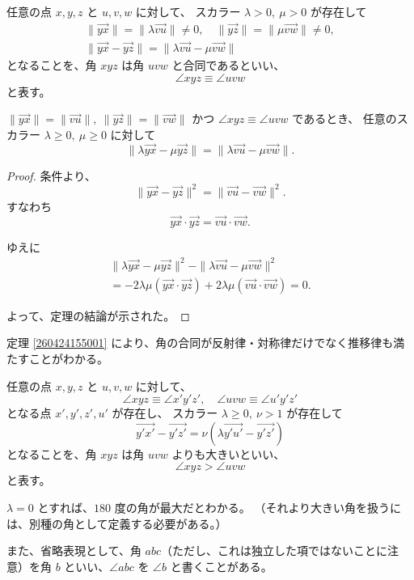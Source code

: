 \begin{dfn}
  任意の点 \(x,y,z\) と \(u,v,w\) に対して、
  スカラー \(\lambda>0,\ \mu>0\) が存在して
  \begin{gather*}
    \|\overrightarrow{yx}\|=\|\lambda\overrightarrow{vu}\|\neq 0,\quad\|\overrightarrow{yz}\|=\|\mu\overrightarrow{vw}\|\neq 0, \\
    \|\overrightarrow{yx}-\overrightarrow{yz}\|=\|\lambda\overrightarrow{vu}-\mu\overrightarrow{vw}\|
  \end{gather*}
  となることを、角 \(xyz\) は角 \(uvw\) と合同であるといい、
  \[\angle xyz\equiv\angle uvw\]
  と表す。
\end{dfn}


\begin{thm}\label{260424155001}
  \(\|\overrightarrow{yx}\|=\|\overrightarrow{vu}\|,\ \|\overrightarrow{yz}\|=\|\overrightarrow{vw}\|\) かつ \(\angle xyz\equiv\angle uvw\) であるとき、
  任意のスカラー \(\lambda\geq 0,\ \mu\geq 0\) に対して
  \[\|\lambda\overrightarrow{yx}-\mu\overrightarrow{yz}\|=\|\lambda\overrightarrow{vu}-\mu\overrightarrow{vw}\|.\]
\end{thm}

\begin{proof}
  条件より、
  \[\|\overrightarrow{yx}-\overrightarrow{yz}\|^2=\|\overrightarrow{vu}-\overrightarrow{vw}\|^2.\]
  すなわち
  \[\overrightarrow{yx}\cdot\overrightarrow{yz}=\overrightarrow{vu}\cdot\overrightarrow{vw}.\]

  ゆえに
  \begin{gather*}
    \|\lambda\overrightarrow{yx}-\mu\overrightarrow{yz}\|^2-\|\lambda\overrightarrow{vu}-\mu\overrightarrow{vw}\|^2 \\
    =-2\lambda\mu(\overrightarrow{yx}\cdot\overrightarrow{yz})+2\lambda\mu(\overrightarrow{vu}\cdot\overrightarrow{vw})=0.
  \end{gather*}

  よって、定理の結論が示された。
\end{proof}

\begin{col*}
  定理 \ref{260424155001} により、角の合同が反射律・対称律だけでなく推移律も満たすことがわかる。
\end{col*}


\begin{dfn}
  任意の点 \(x,y,z\) と \(u,v,w\) に対して、
  \[\angle xyz\equiv\angle x'y'z',\quad \angle uvw\equiv\angle u'y'z'\]
  となる点 \(x',y',z',u'\) が存在し、
    スカラー \(\lambda\geq 0,\ \nu>1\) が存在して
  \[\overrightarrow{y'x'}-\overrightarrow{y'z'}=\nu(\lambda\overrightarrow{y'u'}-\overrightarrow{y'z'})\]
  となることを、角 \(xyz\) は角 \(uvw\) よりも大きいといい、
  \[\angle xyz>\angle uvw\]
  と表す。
\end{dfn}

\begin{col*}
  \(\lambda=0\) とすれば、\(180\) 度の角が最大だとわかる。
  （それより大きい角を扱うには、別種の角として定義する必要がある。）
\end{col*}

また、省略表現として、角 \(abc\)（ただし、これは独立した項ではないことに注意）を角 \(b\) といい、\(\angle abc\) を \(\angle b\) と書くことがある。
